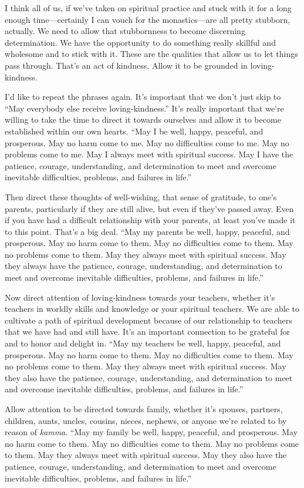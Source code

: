 I think all of us, if we’ve taken on spiritual practice and stuck with
it for a long enough time—certainly I can vouch for the monastics—are
all pretty stubborn, actually. We need to allow that stubbornness to
become discerning determination. We have the opportunity to do something
really skillful and wholesome and to stick with it. These are the
qualities that allow us to let things pass through. That’s an act of
kindness. Allow it to be grounded in loving-kindness.

I’d like to repeat the phrases again. It’s important that we don’t just
skip to “May everybody else receive loving-kindness.” It’s really
important that we’re willing to take the time to direct it towards
ourselves and allow it to become established within our own hearts. “May
I be well, happy, peaceful, and prosperous. May no harm come to me. May
no difficulties come to me. May no problems come to me. May I always
meet with spiritual success. May I have the patience, courage,
understanding, and determination to meet and overcome inevitable
difficulties, problems, and failures in life.”

Then direct these thoughts of well-wishing, that sense of gratitude, to
one’s parents, particularly if they are still alive, but even if they’ve
passed away. Even if you have had a difficult relationship with your
parents, at least you’ve made it to this point. That’s a big deal. “May
my parents be well, happy, peaceful, and prosperous. May no harm come to
them. May no difficulties come to them. May no problems come to them.
May they always meet with spiritual success. May they always have the
patience, courage, understanding, and determination to meet and overcome
inevitable difficulties, problems, and failures in life.”

Now direct attention of loving-kindness towards your teachers, whether
it’s teachers in worldly skills and knowledge or your spiritual
teachers. We are able to cultivate a path of spiritual development
because of our relationship to teachers that we have had and still have.
It’s an important connection to be grateful for and to honor and delight
in. “May my teachers be well, happy, peaceful, and prosperous. May no
harm come to them. May no difficulties come to them. May no problems
come to them. May they always meet with spiritual success. May they also
have the patience, courage, understanding, and determination to meet and
overcome inevitable difficulties, problems, and failures in life.”

Allow attention to be directed towards family, whether it’s spouses,
partners, children, aunts, uncles, cousins, nieces, nephews, or anyone
we’re related to by reason of \emph{kamma}. “May my family be well,
happy, peaceful, and prosperous. May no harm come to them. May no
difficulties come to them. May no problems come to them. May they always
meet with spiritual success. May they also have the patience, courage,
understanding, and determination to meet and overcome inevitable
difficulties, problems, and failures in life.”

